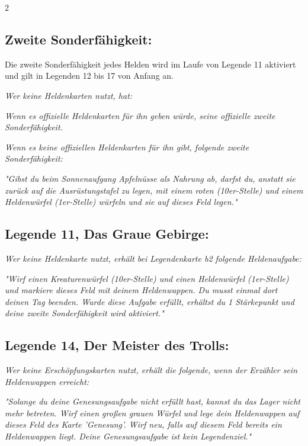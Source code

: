 \documentclass[10pt, a4paper, oneside]{book}
\newcommand{\fan}[1]{\textit{#1}}
\begin{document}
\begin{multicols*}{2}
\begin{bgcolor}
\subsection{Zweite Sonderfähigkeit:}

Die zweite Sonderfähigkeit jedes Helden wird im Laufe von Legende 11 aktiviert und gilt in Legenden 12 bis 17 von Anfang an.


\fan{Wer keine Heldenkarten nutzt, hat:}

\bullet{} \fan{Wenn es offizielle Heldenkarten für ihn geben würde, seine offizielle zweite Sonderfähigkeit.}

\columnbreak

\bullet{} \fan{Wenn es keine offiziellen Heldenkarten für ihn gibt, folgende zweite Sonderfähigkeit:}

\fan{"Gibst du beim Sonnenaufgang Apfelnüsse als Nahrung ab, darfst du, anstatt sie zurück auf die Ausrüstungstafel zu legen, mit einem roten (10er-Stelle) und einem Heldenwürfel (1er-Stelle) würfeln und sie auf dieses Feld legen."}
\supercite{128906}









\subsection{Legende 11, Das Graue Gebirge:}

\fan{Wer keine Heldenkarte nutzt, erhält bei Legendenkarte b2 folgende Heldenaufgabe:}

\fan{"Wirf einen Kreaturenwürfel (10er-Stelle) und einen Heldenwürfel (1er-Stelle) und markiere dieses Feld mit deinem Heldenwappen. Du musst einmal dort deinen Tag beenden. Wurde diese Aufgabe erfüllt, erhältst du 1 Stärkepunkt und deine zweite Sonderfähigkeit wird aktiviert."}




\subsection{Legende 14, Der Meister des Trolls:}

\fan{Wer keine Erschöpfungskarten nutzt, erhält die folgende, wenn der Erzähler sein Heldenwappen erreicht:} 

\fan{"Solange du deine Genesungsaufgabe nicht erfüllt hast, kannst du das Lager nicht mehr betreten. Wirf einen großen grauen Würfel und lege dein Heldenwappen auf dieses Feld des Karte 'Genesung'. Wirf neu, falls auf diesem Feld bereits ein Heldenwappen liegt. Deine Genesungsaufgabe ist kein Legendenziel."}


\end{bgcolor}
\end{multicols*}
\end{document}
